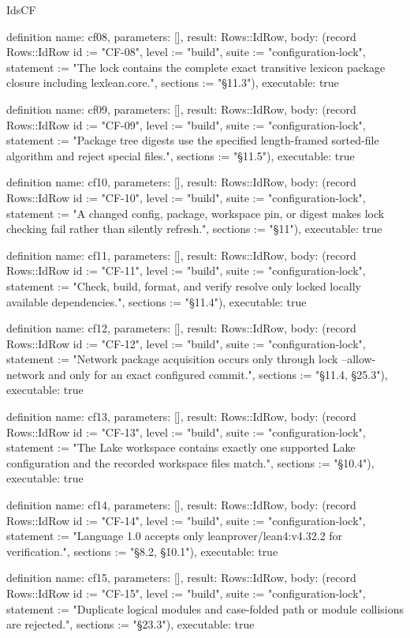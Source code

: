 \begin{lexlean}{IdsCF}
\begin{semanticmodule}
definition{
  name: cf08,
  parameters: [],
  result: Rows::IdRow,
  body: (record Rows::IdRow {id := "CF-08", level := "build", suite := "configuration-lock", statement := "The lock contains the complete exact transitive lexicon package closure including lexlean.core.", sections := "§11.3"}),
  executable: true
}

definition{
  name: cf09,
  parameters: [],
  result: Rows::IdRow,
  body: (record Rows::IdRow {id := "CF-09", level := "build", suite := "configuration-lock", statement := "Package tree digests use the specified length-framed sorted-file algorithm and reject special files.", sections := "§11.5"}),
  executable: true
}

definition{
  name: cf10,
  parameters: [],
  result: Rows::IdRow,
  body: (record Rows::IdRow {id := "CF-10", level := "build", suite := "configuration-lock", statement := "A changed config, package, workspace pin, or digest makes lock checking fail rather than silently refresh.", sections := "§11"}),
  executable: true
}

definition{
  name: cf11,
  parameters: [],
  result: Rows::IdRow,
  body: (record Rows::IdRow {id := "CF-11", level := "build", suite := "configuration-lock", statement := "Check, build, format, and verify resolve only locked locally available dependencies.", sections := "§11.4"}),
  executable: true
}

definition{
  name: cf12,
  parameters: [],
  result: Rows::IdRow,
  body: (record Rows::IdRow {id := "CF-12", level := "build", suite := "configuration-lock", statement := "Network package acquisition occurs only through lock --allow-network and only for an exact configured commit.", sections := "§11.4, §25.3"}),
  executable: true
}

definition{
  name: cf13,
  parameters: [],
  result: Rows::IdRow,
  body: (record Rows::IdRow {id := "CF-13", level := "build", suite := "configuration-lock", statement := "The Lake workspace contains exactly one supported Lake configuration and the recorded workspace files match.", sections := "§10.4"}),
  executable: true
}

definition{
  name: cf14,
  parameters: [],
  result: Rows::IdRow,
  body: (record Rows::IdRow {id := "CF-14", level := "build", suite := "configuration-lock", statement := "Language 1.0 accepts only leanprover/lean4:v4.32.2 for verification.", sections := "§8.2, §10.1"}),
  executable: true
}

definition{
  name: cf15,
  parameters: [],
  result: Rows::IdRow,
  body: (record Rows::IdRow {id := "CF-15", level := "build", suite := "configuration-lock", statement := "Duplicate logical modules and case-folded path or module collisions are rejected.", sections := "§23.3"}),
  executable: true
}


\end{semanticmodule}
\end{lexlean}
